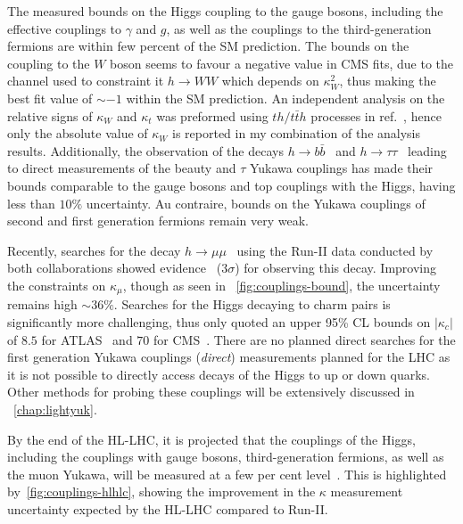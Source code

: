\par The measured bounds on the Higgs coupling to the gauge bosons, including the effective couplings to $\gamma$ and $g$, as well as the couplings to the third-generation fermions are within few percent of the SM prediction. The bounds on the coupling to the $W$ boson seems to favour a negative value in CMS fits, due to the channel used to constraint it $ h \to WW$ which depends on $ \kappa_W^2$, thus making the best fit value of $ \sim -1$ within the SM prediction. An independent analysis on the relative signs of $\kappa_W$ and $\kappa_t$ was preformed using $th/t \bar{t} h$ processes in ref.~\cite{CMS:2018jeh}, hence only the absolute value of $\kappa_W$ is reported in my combination of the analysis results.  Additionally,  the observation of the decays $ h \to b \bar{b}$~\cite{CMS:2018nsn,ATLAS:2018kot,ATLAS:2019yhn} and $h \to \tau \tau$~\cite{ATLAS:2018ynr,CMS:2019pyn} leading to direct measurements of the beauty and $\tau$ Yukawa couplings has  made their bounds comparable to the gauge bosons and top couplings with the Higgs, having less than $10\%$ uncertainty.  Au contraire, bounds on the Yukawa couplings of second and first generation fermions remain very weak.  
\par Recently, searches for the decay  $ h\to \mu \mu$~\cite{ATLAS:2020fzp,CMS:2020xwi} using the Run-II data conducted by both collaborations showed evidence ~($ 3 \sigma$) for observing this decay. Improving the constraints on $\kappa_\mu$, though as seen in ~\autoref{fig:couplings-bound}, the uncertainty remains high $ \sim 36 \%$.  Searches for the Higgs decaying to charm pairs is significantly more challenging, thus only quoted an upper 95\% CL  bounds on $ |\kappa_c|$ of $8.5$ for ATLAS~\cite{ATLAS-CONF-2021-021,ATLAS:2022ers} and $70$ for CMS~\cite{CMS:2019hve}. There are no planned direct searches for the first generation Yukawa couplings (\emph{direct}) measurements planned for the LHC as it is not possible to directly access decays of the Higgs to up or down quarks. Other methods for probing these couplings will be extensively discussed in  ~\autoref{chap:lightyuk}.
\par By the end of the HL-LHC, it is projected that the couplings of the Higgs, including the couplings with gauge bosons, third-generation fermions, as well as the muon Yukawa, will be measured at a few per cent level~\cite{Bernius:2666331}. This is highlighted by~\autoref{fig:couplings-hlhlc},  showing the improvement in the $\kappa$ measurement uncertainty expected by the HL-LHC compared to Run-II.

